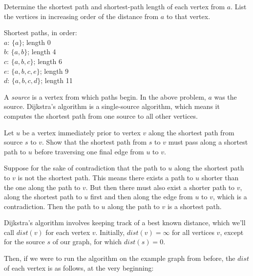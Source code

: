 \documentclass[11pt]{article}
\begin{document}
\begin{problem} %
\label{example-computation}
Determine the shortest path and shortest-path length of each vertex from $a$. List the vertices in increasing order of the distance
from $a$ to that vertex.
\end{problem}

\begin{solution}
Shortest paths, in order: \\
$a$: $\{a\}$; length 0 \\
$b$: $\{a, b\}$; length 4 \\
$c$: $\{a, b, c\}$; length 6 \\
$e$: $\{a, b, c, e\}$; length 9 \\
$d$: $\{a, b, c, d\}$; length 11
\end{solution}

\begin{definition}
\label{def:source}
A \textit{source} is a vertex from which paths begin. In the above problem, $a$ was the source. Dijkstra's algorithm
is a single-source algorithm, which means it computes the shortest path from one source to all other vertices.
\end{definition}

\begin{problem} %
Let $u$ be a vertex immediately prior to vertex $v$ along the shortest path from source $s$ to $v$. Show that the shortest path from $s$ to $v$ must
pass along a shortest path to $u$ before traversing one final edge from $u$ to $v$.
\end{problem}

\begin{solution}
Suppose for the sake of contradiction that the path to $u$ along the shortest path to $v$ is not the shortest path. This means
there exists a path to $u$ shorter than the one along the path to $v$. But then there must also exist a shorter path to $v$, along
the shortest path to $u$ first and then along the edge from $u$ to $v$, which is a contradiction. Then the path to $u$ along the path to $v$
is a shortest path.
\end{solution}

Dijkstra's algorithm involves keeping track of a best known distance, which we'll call $dist(v)$ for each vertex $v$. Initially, $dist(v) = \infty$ for
all vertices $v$, except for the source $s$ of our graph, for which $dist(s) = 0$.

Then, if we were to run the algorithm on the example graph from before, the $dist$ of each vertex is as follows, at the very beginning:
\end{document}
